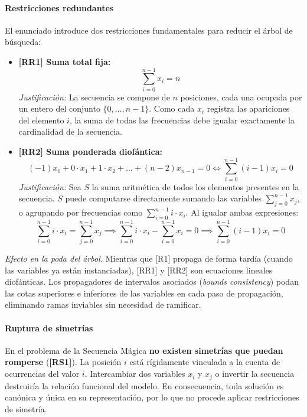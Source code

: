\paragraph{Restricciones redundantes}
El enunciado introduce dos restricciones fundamentales para reducir el árbol de búsqueda:
\begin{itemize}
    \item \textbf{[RR1] Suma total fija:}
    \[
    \sum_{i=0}^{n-1} x_i = n
    \]
    \textit{Justificación:} La secuencia se compone de $n$ posiciones, cada una ocupada por un entero del conjunto $\{0, \dots, n-1\}$. Como cada $x_i$ registra las apariciones del elemento $i$, la suma de todas las frecuencias debe igualar exactamente la cardinalidad de la secuencia.
    
    \item \textbf{[RR2] Suma ponderada diofántica:}
    \[
    (-1)x_0 + 0 \cdot x_1 + 1 \cdot x_2 + \dots + (n-2)x_{n-1} = 0 \iff \sum_{i=0}^{n-1} (i - 1) x_i = 0
    \]
    \textit{Justificación:} Sea $S$ la suma aritmética de todos los elementos presentes en la secuencia. $S$ puede computarse directamente sumando las variables $\sum_{j=0}^{n-1} x_j$, o agrupando por frecuencias como $\sum_{i=0}^{n-1} i \cdot x_i$. Al igualar ambas expresiones:
    \[
    \sum_{i=0}^{n-1} i \cdot x_i = \sum_{j=0}^{n-1} x_j \implies \sum_{i=0}^{n-1} i \cdot x_i - \sum_{i=0}^{n-1} x_i = 0 \implies \sum_{i=0}^{n-1} (i - 1) x_i = 0
    \]
\end{itemize}

\textit{Efecto en la poda del árbol.} Mientras que [R1] propaga de forma tardía (cuando las variables ya están instanciadas), [RR1] y [RR2] son ecuaciones lineales diofánticas. Los propagadores de intervalos asociados (\textit{bounds consistency}) podan las cotas superiores e inferiores de las variables en cada paso de propagación, eliminando ramas inviables sin necesidad de ramificar.

\paragraph{Ruptura de simetrías}
En el problema de la Secuencia Mágica \textbf{no existen simetrías que puedan romperse} (\textbf{[RS1]}). La posición $i$ está rígidamente vinculada a la cuenta de ocurrencias del valor $i$. Intercambiar dos variables $x_i$ y $x_j$ o invertir la secuencia destruiría la relación funcional del modelo. En consecuencia, toda solución es canónica y única en su representación, por lo que no procede aplicar restricciones de simetría.

